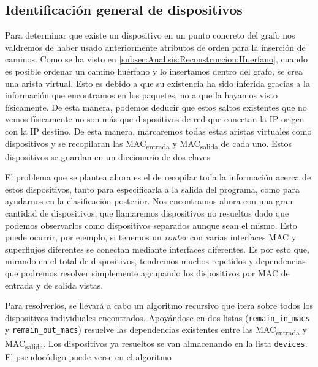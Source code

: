 \documentclass[twoside, 12pt]{epstfg}
\begin{document}
\subsection{Identificación general de dispositivos}
Para determinar que existe un dispositivo en un punto concreto del grafo nos valdremos de haber usado anteriormente atributos de orden para la inserción de caminos. Como se ha visto en \ref{subsec:Analisis:Reconstruccion:Huerfano}, cuando es posible ordenar un camino huérfano y lo insertamos dentro del grafo, se crea una arista virtual. Esto es debido a que su existencia ha sido inferida gracias a la información que encontramos en los paquetes, no a que la hayamos visto físicamente. De esta manera, podemos deducir que estos saltos existentes que no vemos físicamente no son más que dispositivos de red que conectan la IP origen con la IP destino. De esta manera, marcaremos todas estas aristas virtuales como dispositivos y se recopilaran las MAC\textsubscript{entrada} y MAC\textsubscript{salida} de cada uno. Estos dispositivos se guardan en un diccionario de dos claves

El problema que se plantea ahora es el de recopilar toda la información acerca de estos dispositivos, tanto para especificarla a la salida del programa, como para ayudarnos en la clasificación posterior. Nos encontramos ahora con una gran cantidad de dispositivos, que llamaremos dispositivos no resueltos dado que podemos observarlos como dispositivos separados aunque sean el mismo. Esto puede ocurrir, por ejemplo, si tenemos un \textit{router} con varias interfaces MAC y superflujos diferentes se conectan mediante interfaces diferentes. Es por esto que, mirando en el total de dispositivos, tendremos muchos repetidos y dependencias que podremos resolver simplemente agrupando los dispositivos por MAC de entrada y de salida vistas.

Para resolverlos, se llevará a cabo un algoritmo recursivo que itera sobre todos los dispositivos individuales encontrados. Apoyándose en dos listas (\texttt{remain\_in\_macs} y \texttt{remain\_out\_macs}) resuelve las dependencias existentes entre las MAC\textsubscript{entrada} y MAC\textsubscript{salida}. Los dispositivos ya resueltos se van almacenando en la lista \texttt{devices}. El pseudocódigo puede verse en el algoritmo 
\end{document}
